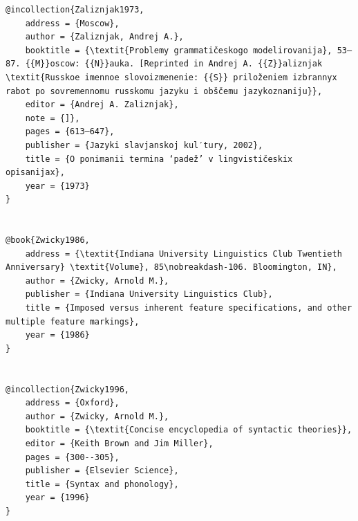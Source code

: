 \documentclass[output=paper]{langscibook}
\begin{document}
\begin{verbatim}
@incollection{Zaliznjak1973,
	address = {Moscow},
	author = {Zaliznjak, Andrej A.},
	booktitle = {\textit{Problemy grammatičeskogo modelirovanija}, 53–87. {{M}}oscow: {{N}}auka. [Reprinted in Andrej A. {{Z}}aliznjak \textit{Russkoe imennoe slovoizmenenie: {{S}} priloženiem izbrannyx rabot po sovremennomu russkomu jazyku i obščemu jazykoznaniju}},
	editor = {Andrej A. Zaliznjak},
	note = {]},
	pages = {613–647},
	publisher = {Jazyki slavjanskoj kul′tury, 2002},
	title = {O ponimanii termina ‘padež’ v lingvističeskix opisanijax},
	year = {1973}
}


@book{Zwicky1986,
	address = {\textit{Indiana University Linguistics Club Twentieth Anniversary} \textit{Volume}, 85\nobreakdash-106. Bloomington, IN},
	author = {Zwicky, Arnold M.},
	publisher = {Indiana University Linguistics Club},
	title = {Imposed versus inherent feature specifications, and other multiple feature markings},
	year = {1986}
}


@incollection{Zwicky1996,
	address = {Oxford},
	author = {Zwicky, Arnold M.},
	booktitle = {\textit{Concise encyclopedia of syntactic theories}},
	editor = {Keith Brown and Jim Miller},
	pages = {300--305},
	publisher = {Elsevier Science},
	title = {Syntax and phonology},
	year = {1996}
}


\end{verbatim}
\sloppy\printbibliography[heading=subbibliography,notkeyword=this]
\end{document}
